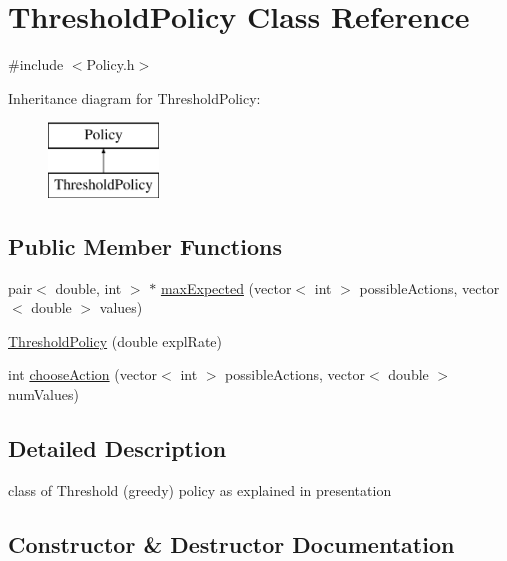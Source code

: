 \hypertarget{class_threshold_policy}{}\section{Threshold\+Policy Class Reference}
\label{class_threshold_policy}


{\ttfamily \#include $<$Policy.\+h$>$}

Inheritance diagram for Threshold\+Policy\+:\begin{figure}[H]
\begin{center}
\leavevmode
\includegraphics[height=2.000000cm]{class_threshold_policy}
\end{center}
\end{figure}
\subsection*{Public Member Functions}
\begin{DoxyCompactItemize}
\item 
pair$<$ double, int $>$ $\ast$ \mbox{\hyperlink{class_threshold_policy_aa58828f3e4165f04fb9980766ce8af06}{max\+Expected}} (vector$<$ int $>$ possible\+Actions, vector$<$ double $>$ values)
\item 
\mbox{\hyperlink{class_threshold_policy_a513adac04628872e7c7042481dc7c457}{Threshold\+Policy}} (double expl\+Rate)
\item 
int \mbox{\hyperlink{class_threshold_policy_a9f8e4051589b915971ffc647ba7fe623}{choose\+Action}} (vector$<$ int $>$ possible\+Actions, vector$<$ double $>$ num\+Values)
\end{DoxyCompactItemize}


\subsection{Detailed Description}
class of Threshold (greedy) policy as explained in presentation 

\subsection{Constructor \& Destructor Documentation}
\mbox{\label{class_threshold_policy_a513adac04628872e7c7042481dc7c457}} 
